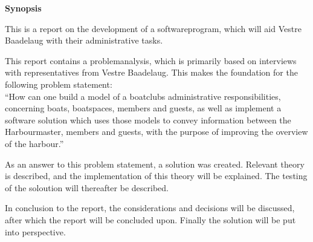 \begin{center}\textbf{Synopsis}\\ \end{center}

This is a report on the development of a softwareprogram, which will aid Vestre Baadelaug with their administrative tasks.

This report contains a problemanalysis, which is primarily based on interviews with representatives from Vestre Baadelaug. This makes the foundation for the following problem statement:\\

\enquote{How can one build a model of a boatclubs administrative responsibilities, concerning boats, boatspaces, members and guests, as well as implement a software solution which uses those models to convey information between the Harbourmaster, members and guests, with the purpose of improving the overview of the harbour.}

As an answer to this problem statement, a solution was created. Relevant theory is described, and the implementation of this theory will be explained. The testing of the soloution will thereafter be described.

In conclusion to the report, the considerations and decisions will be discussed, after which the report will be concluded upon. Finally the solution will be put into perspective.